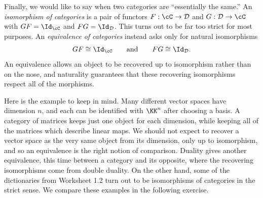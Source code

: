 \documentclass[12pt,reqno]{amsart}
\begin{document}
\hrulefill

Finally, we would like to say when two categories are ``essentially the same.'' An \emph{isomorphism of categories} is a pair of functors $F:\cC\to\mathcal D$ and $G:\mathcal D\to\cC$ with $GF=\Id_{\cC}$ and $FG=\Id_{\mathcal D}$. This turns out to be far too strict for most purposes. An \emph{equivalence of categories} instead asks only for natural isomorphisms
\[
GF\cong\Id_{\cC}\qquad\text{and}\qquad FG\cong\Id_{\mathcal D}.
\]
An equivalence allows an object to be recovered up to isomorphism rather than on the nose, and naturality guarantees that these recovering isomorphisms respect all of the morphisms.

Here is the example to keep in mind. Many different vector spaces have dimension $n$, and each can be identified with $\KK^n$ after choosing a basis. A category of matrices keeps just one object for each dimension, while keeping all of the matrices which describe linear maps. We should not expect to recover a vector space as the very same object from its dimension, only up to isomorphism, and so an equivalence is the right notion of comparison. Duality gives another equivalence, this time between a category and its opposite, where the recovering isomorphisms come from double duality. On the other hand, some of the dictionaries from Worksheet 1.2 turn out to be isomorphisms of categories in the strict sense. We compare these examples in the following exercise.

\hrulefill
\end{document}
